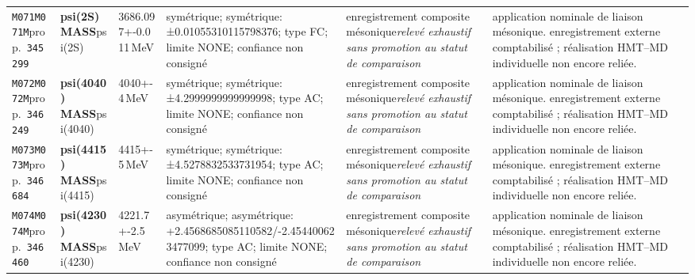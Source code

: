 \begin{landscape}
\begin{longtable}{L{1.85cm}L{4.45cm}L{2.35cm}L{4.05cm}L{3.35cm}L{7.15cm}}
\texttt{M071}\newline \texttt{M071M}\newline prop.\ \texttt{345299} & \textbf{psi(2S) MASS}\newline psi(2S) & 3686.097+-0.011\,MeV & symétrique; symétrique: ±0.01055310115798376; type FC; limite NONE; confiance non consigné & enregistrement composite mésonique\newline \emph{relevé exhaustif sans promotion au statut de comparaison} & application nominale de liaison mésonique. enregistrement externe comptabilisé ; réalisation HMT--MD individuelle non encore reliée. \\
\texttt{M072}\newline \texttt{M072M}\newline prop.\ \texttt{346249} & \textbf{psi(4040) MASS}\newline psi(4040) & 4040+-4\,MeV & symétrique; symétrique: ±4.2999999999999998; type AC; limite NONE; confiance non consigné & enregistrement composite mésonique\newline \emph{relevé exhaustif sans promotion au statut de comparaison} & application nominale de liaison mésonique. enregistrement externe comptabilisé ; réalisation HMT--MD individuelle non encore reliée. \\
\texttt{M073}\newline \texttt{M073M}\newline prop.\ \texttt{346684} & \textbf{psi(4415) MASS}\newline psi(4415) & 4415+-5\,MeV & symétrique; symétrique: ±4.5278832533731954; type AC; limite NONE; confiance non consigné & enregistrement composite mésonique\newline \emph{relevé exhaustif sans promotion au statut de comparaison} & application nominale de liaison mésonique. enregistrement externe comptabilisé ; réalisation HMT--MD individuelle non encore reliée. \\
\texttt{M074}\newline \texttt{M074M}\newline prop.\ \texttt{346460} & \textbf{psi(4230) MASS}\newline psi(4230) & 4221.7+-2.5\,MeV & asymétrique; asymétrique: +2.4568685085110582/-2.454400623477099; type AC; limite NONE; confiance non consigné & enregistrement composite mésonique\newline \emph{relevé exhaustif sans promotion au statut de comparaison} & application nominale de liaison mésonique. enregistrement externe comptabilisé ; réalisation HMT--MD individuelle non encore reliée. \\

\end{longtable}
\end{landscape}

